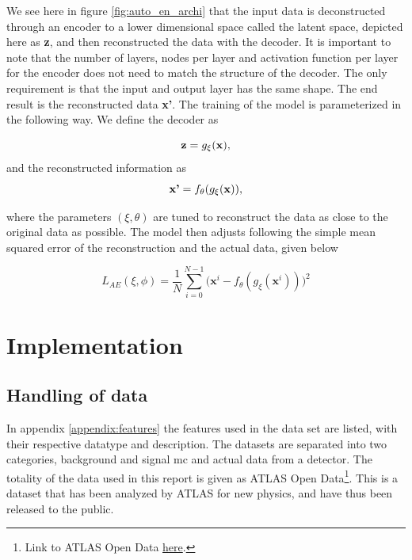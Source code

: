 \documentclass[ reprint, amsmath,amssymb, aps, nofootinbib]{revtex4-2}
\begin{document}
We see here in figure \ref{fig:auto_en_archi} that the input data is deconstructed through an encoder to a lower dimensional space called the latent space, depicted here as \textbf{z}, and then reconstructed the data with the decoder. It is important to note that the number of layers, nodes per layer and activation function per layer for the encoder does not need to match the structure of the decoder. The only requirement is that the input and output layer has the same shape. The end result is the reconstructed data \textbf{x'}. The training of the model is parameterized in the following way. We define the decoder as 

\begin{equation*}
    \textbf{z} = g_{\xi}(\bf{x}),
\end{equation*}
and the reconstructed information as 
\begin{equation*}
    \textbf{x'} = f_{\theta}(g_{\xi}(\bf{x})),
\end{equation*}

where the parameters $(\xi, \theta)$ are tuned to reconstruct the data as close to the original data as possible. The model then adjusts following the simple mean squared error of the reconstruction and the actual data, given below

\begin{equation*}
    L_{AE}(\xi, \phi)= \frac{1}{N} \sum_{i=0}^{N-1}\bigg( \textbf{x}^i - f_{\theta}(g_{\xi}(\textbf{x}^i))\bigg)^2
\end{equation*}



\section{Implementation}

\subsection{Handling of data}

In appendix \ref{appendix:features} the features used in the data set are listed, with their respective datatype and description. The datasets are separated into two categories, background and signal mc and actual data from a detector. The totality of the data used in this report is given as ATLAS Open Data\footnote{Link to ATLAS Open Data \href{https://atlas.cern/resources/opendata}{here}.}. This is a dataset that has been analyzed by ATLAS for new physics, and have thus been released to the public. 
\end{document}
